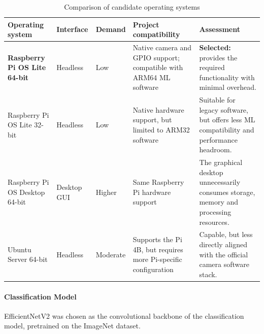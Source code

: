 \begin{table}[htbp]
    \centering
    \caption{Comparison of candidate operating systems}
    \label{tab:os-comparison}
    \small
    \renewcommand{\arraystretch}{1.15}

    \begin{tabularx}{\textwidth}{
        >{\raggedright\arraybackslash}p{2.7cm}
        >{\centering\arraybackslash}p{1.5cm}
        >{\centering\arraybackslash}p{1.5cm}
        >{\raggedright\arraybackslash}X
        >{\raggedright\arraybackslash}X}

        \toprule
        \textbf{Operating system} & \textbf{Interface} &
        \textbf{Demand} & \textbf{Project compatibility} &
        \textbf{Assessment} \\
        \midrule

        \rowcolor{green!12}
        \textbf{Raspberry Pi OS Lite 64-bit}
        \cite{RaspberryPiOS,RaspberryPiOS64} &
        Headless &
        Low &
        Native camera and GPIO support; compatible with ARM64 ML software &
        \textbf{Selected:} provides the required functionality with minimal overhead. \\

        Raspberry Pi OS Lite 32-bit
        \cite{RaspberryPiOS} &
        Headless &
        Low &
        Native hardware support, but limited to ARM32 software &
        Suitable for legacy software, but offers less ML compatibility and performance headroom. \\

        Raspberry Pi OS Desktop 64-bit
        \cite{RaspberryPiOS} &
        Desktop GUI &
        Higher &
        Same Raspberry Pi hardware support &
        The graphical desktop unnecessarily consumes storage, memory and processing resources. \\

        Ubuntu Server 64-bit
        \cite{UbuntuRaspberryPi} &
        Headless &
        Moderate &
        Supports the Pi 4B, but requires more Pi-specific configuration &
        Capable, but less directly aligned with the official camera software stack. \\

        \bottomrule
    \end{tabularx}
\end{table}

\paragraph{Classification Model}
\par\vspace{6pt}
EfficientNetV2 was chosen as the convolutional backbone of the classification model, pretrained on the ImageNet dataset.

